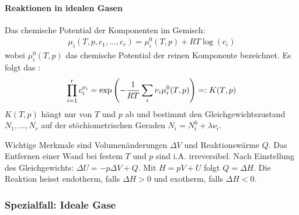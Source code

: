 \paragraph{Reaktionen in idealen Gasen}
Das chemische Potential der Komponenten im Gemisch:
\begin{align*}
    \mu_i (T,p,c_1,\dots,c_r) = \mu_i^0 (T,p) + R T \log(c_i)
\end{align*}
wobei $\mu_i^0(T,p)$ das chemische Potential der reinen Komponente bezeichnet.
Es folgt das :
\begin{align*}
    \prod_{i=1}^r c_i^{\nu_i} =
    \exp \left( - \frac{1}{R T} \sum_i \nu_i \mu_i^0(T,p) \right)
    =: K(T,p)
\end{align*}
$K(T,p)$ hängt nur von $T$ und $p$ ab und bestimmt den Gleichgewichtszustand
$N_1,\dots,N_r$ auf der stöchiometrischen Geraden $N_i = N_i^0 + \lambda \nu_i$.

Wichtige Merkmale sind Volumenänderungen $\Delta V$ und Reaktionswärme $Q$.
Das Entfernen einer Wand bei festem $T$ und $p$ sind i.A. irreversibel. Nach
Einstellung des Gleichgewichts: $\Delta U = - p \Delta V + Q$. Mit
$H = p V + U$ folgt $Q = \Delta H$. Die Reaktion heisst endotherm, falls
$\Delta H > 0$ und exotherm, falls $\Delta H < 0$.

\subsubsection{Spezialfall: Ideale Gase}

